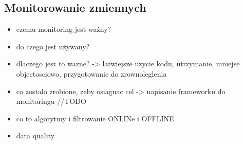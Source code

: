 \subsection{Monitorowanie zmiennych}

\begin{itemize}
\item czemu monitoring jest ważny?
\item do czego jest używany?
\item dlaczego jest to wazne? -> latwiejsze uzycie kodu, utrzymanie, mniejse objectosciowo, przygotowanie do zrownoleglenia
\item co zostalo zrobione, zeby osiagnac cel -> napisanie frameworku do monitoringu //TODO

\item co to algorytmy i filtrowanie ONLINe i OFFLINE
\item data quality
\end{itemize}